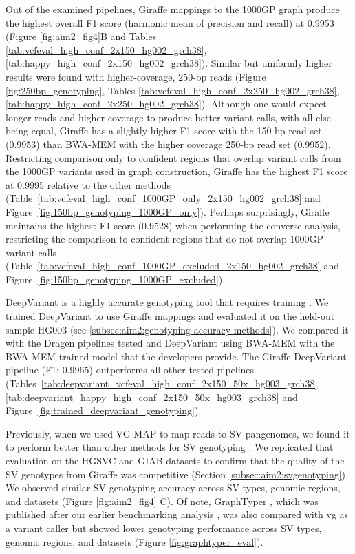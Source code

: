 \documentclass[11pt]{ucscthesis}
\begin{document}
Out of the examined pipelines, Giraffe mappings to the 1000GP graph produce the highest overall F1 score (harmonic mean of precision and recall) at 0.9953 (Figure \ref{fig:aim2_fig4}B and Tables \ref{tab:vcfeval_high_conf_2x150_hg002_grch38}, \ref{tab:happy_high_conf_2x150_hg002_grch38}).
Similar but uniformly higher results were found with higher-coverage, 250-bp reads (Figure \ref{fig:250bp_genotyping}, Tables \ref{tab:vcfeval_high_conf_2x250_hg002_grch38}, \ref{tab:happy_high_conf_2x250_hg002_grch38}).
Although one would expect longer reads and higher coverage to produce better variant calls, with all else being equal, Giraffe has a slightly higher F1 score with the 150-bp read set (0.9953) than BWA-MEM with the higher coverage 250-bp read set (0.9952).
Restricting comparison only to confident regions that overlap variant calls from the 1000GP variants used in graph construction, Giraffe has the highest F1 score at 0.9995 relative to the other methods (Table~\ref*{tab:vcfeval_high_conf_1000GP_only_2x150_hg002_grch38} and Figure~\ref*{fig:150bp_genotyping_1000GP_only}).
Perhaps surprisingly, Giraffe maintains the highest F1 score (0.9528) when performing the converse analysis, restricting the comparison to confident regions that do not overlap 1000GP variant calls (Table~\ref*{tab:vcfeval_high_conf_1000GP_excluded_2x150_hg002_grch38} and Figure~\ref*{fig:150bp_genotyping_1000GP_excluded}).

DeepVariant is a highly accurate genotyping tool that requires training \cite{poplin_universal_2018}.
We trained DeepVariant to use Giraffe mappings and evaluated it on the held-out sample HG003 (see \ref{subsec:aim2:genotyping-accuracy-methods}).
We compared it with the Dragen pipelines tested and DeepVariant using BWA-MEM with the BWA-MEM trained model that the developers provide.
The Giraffe-DeepVariant pipeline (F1: 0.9965) outperforms all other tested pipelines (Tables~\ref*{tab:deepvariant_vcfeval_high_conf_2x150_50x_hg003_grch38}, \ref*{tab:deepvariant_happy_high_conf_2x150_50x_hg003_grch38} and Figure~\ref*{fig:trained_deepvariant_genotyping}).

Previously, when we used VG-MAP to map reads to SV pangenomes, we found it to perform better than other methods for SV genotyping \cite{hickey_vgsv_2020}.
We replicated that evaluation on the HGSVC and GIAB datasets \cite{zook_robust_2020,chaisson_sv_2019} to confirm that the quality of the SV genotypes from Giraffe was competitive (Section \ref{subsec:aim2:svgenotyping}).
We observed similar SV genotyping accuracy across SV types, genomic regions, and datasets (Figure \ref{fig:aim2_fig4} C). Of note, GraphTyper \cite{eggertsson2019}, which was published after our earlier benchmarking analysis \cite{hickey_vgsv_2020}, was also compared with vg as a variant caller but showed lower genotyping performance across SV types, genomic regions, and datasets  (Figure \ref{fig:graphtyper_eval}).
\end{document}
